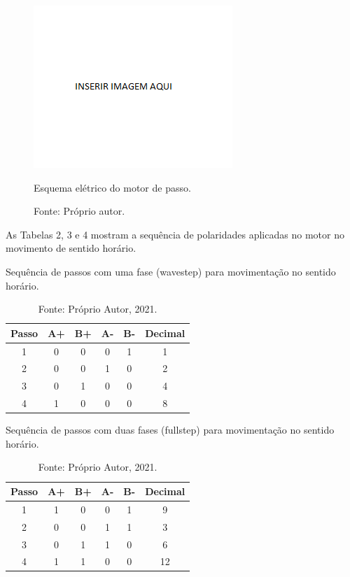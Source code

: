 \begin{figure}[!htb]
\centering
\includegraphics[scale = 0.2]{figuras/3-16}
\caption{Esquema elétrico do motor de passo.}
\caption*{Fonte: Próprio autor.}
\label{figesquemaeletrico}
\end{figure}
    
As Tabelas 2, 3 e 4 mostram a sequência de polaridades aplicadas no motor no movimento de sentido horário.

\begin{table}
    \centering
    \caption{Sequência de passos com uma fase (wavestep) para movimentação no sentido horário.}
    \begin{tabular}{cccccc}
        \hline
        \textbf{Passo} & \textbf{A+} & \textbf{B+} & \textbf{A-} & \textbf{B-} & \textbf{Decimal}\\
        \hline
        1 & 0 & 0 & 0 & 1 & 1\\
        2 & 0 & 0 & 1 & 0 & 2\\
        3 & 0 & 1 & 0 & 0 & 4\\
        4 & 1 & 0 & 0 & 0 & 8\\        
        \hline       
    \end{tabular}
    \caption*{Fonte: Próprio Autor, 2021.}
    \label{tab:wavestephorario}
\end{table}

\begin{table}
    \centering
    \caption{Sequência de passos com duas fases (fullstep) para movimentação no sentido horário.}
    \begin{tabular}{cccccc}
        \hline
        \textbf{Passo} & \textbf{A+} & \textbf{B+} & \textbf{A-} & \textbf{B-} & \textbf{Decimal}\\
        \hline
        1 & 1 & 0 & 0 & 1 & 9\\
        2 & 0 & 0 & 1 & 1 & 3\\
        3 & 0 & 1 & 1 & 0 & 6\\
        4 & 1 & 1 & 0 & 0 & 12\\
        \hline       
    \end{tabular}
    \caption*{Fonte: Próprio Autor, 2021.}
    \label{tab:fullstephorario}
\end{table}

